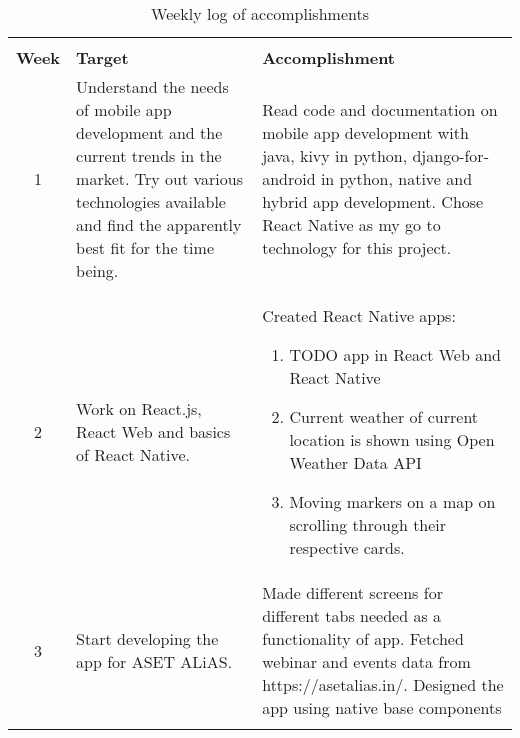 \begin{center}
  \begin{longtable} {|c|p{5cm}|p{5cm}|}
    \hline\\
    \textbf{Week} & \textbf{Target} & \textbf{Accomplishment}\\
    \hline
    1& Understand the needs of mobile app development and the current trends in the market. Try out various technologies available and find the apparently best fit for the time being.& Read code and documentation on mobile app development with java, kivy in python, django-for-android in python, native and hybrid app development. Chose React Native as my go to technology for this project.\\
    \hline
    2& Work on React.js, React Web and basics of React Native.& Created React Native apps: 
    \begin{enumerate} 
        \item TODO app in React Web and React Native
        \item Current weather of current location is shown using Open Weather Data API
        \item Moving markers on a map on scrolling through their respective cards.
    \end{enumerate}\\
    \hline
    3& Start developing the app for ASET ALiAS.& Made different screens for different tabs needed as a functionality of app. Fetched webinar and events data from https://asetalias.in/. Designed the app using native base components \\
    \hline
    \caption{Weekly log of accomplishments}
  \end{longtable}
  
  \label{tab:schedule}
\end{center}